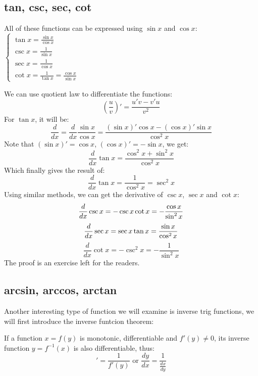\documentclass{article}
\begin{document}
\subsection{tan, csc, sec, cot}
All of these functions can be expressed using $\sin x$ and $\cos x$:
$\begin{cases}
    \tan x = \frac{\sin x}{\cos x}\\
    \csc x = \frac{1}{\sin x}\\
    \sec x = \frac{1}{\cos x}\\
    \cot x = \frac{1}{\tan x} = \frac{\cos x}{\sin x}
\end{cases}$

We can use quotient law to differentiate the functions:
\begin{equation}
    (\frac{u}{v})' = \frac{u'v - v'u}{v^2}
\end{equation}
For $\tan x$, it will be:
\[
    \frac{d}{dx} = \frac{d}{dx}\frac{\sin x}{\cos x} = \frac{(\sin x)' \cos x - (\cos x)' \sin x}{\cos^2 x}
\]
Note that $(\sin x)' = \cos x$, $(\cos x)' = -\sin x$, we get:
\[
    \frac{d}{dx}\tan x = \frac{\cos^2 x + \sin^2 x}{\cos^2 x}
\]
Which finally gives the result of:
\begin{equation}
    \frac{d}{dx} \tan x = \frac{1}{\cos^2 x} = \sec^2 x
\end{equation}
Using similar methods, we can get the derivative of $\csc x$, $\sec x$ and $\cot x$:
\begin{equation}
    \frac{d}{dx} \csc x = -\csc x \cot x = -\frac{\cos x}{\sin^2 x}\\
\end{equation}
\begin{equation}
    \frac{d}{dx} \sec x = \sec x \tan x = \frac{\sin x}{\cos^2 x}\\
\end{equation}
\begin{equation}
    \frac{d}{dx} \cot x = -\csc^2 x = -\frac{1}{\sin^2 x}
\end{equation}
The proof is an exercise left for the readers.

\subsection{arcsin, arccos, arctan}
Another interesting type of function we will examine is inverse trig functions, we will first introduce the inverse funtcion theorem:

If a function $x = f(y)$ is monotonic, differentiable and $f'(y) \neq 0$, its inverse function $y = f^{-1}(x)$ is also differentiable, thus:
\begin{equation}
    [f^{-1}(x)]' = \frac{1}{f'(y)} \text{ or } \frac{dy}{dx} = \frac{1}{\frac{dx}{dy}}
\end{equation}
\end{document}
